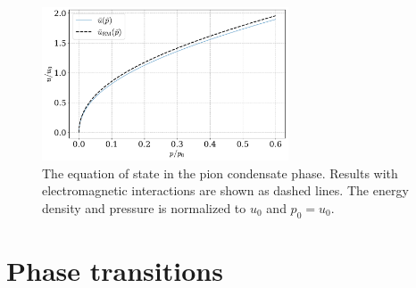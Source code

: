 \begin{figure}[!htb]
    \centering
    \includegraphics[width=0.65\textwidth]{../scripts/figurer/pion_star/pion_eos_EM.pdf}
    \caption{
        The equation of state in the pion condensate phase. 
        Results with electromagnetic interactions are shown as dashed lines.
        The energy density and pressure is normalized to $u_0$ and $p_0 = u_0$.
        }
    \label{fig: eos chpt em interaction}
\end{figure}





\section{Phase transitions}
\label{section: phase transition}



